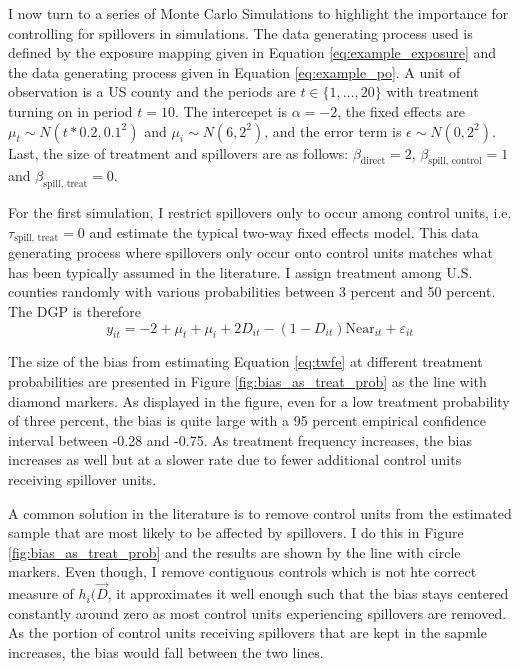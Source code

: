 \documentclass[11pt]{article}
\begin{document}
I now turn to a series of Monte Carlo Simulations to highlight the importance for controlling for spillovers in simulations. The data generating process used is defined by the exposure mapping given in Equation \ref{eq:example_exposure} and the data generating process given in Equation \ref{eq:example_po}. A unit of observation is a US county and the periods are $t \in \{1, \dots, 20\}$ with treatment turning on in period $t = 10$. The intercepet is $\alpha = -2$, the fixed effects are $\mu_t \sim N(t * 0.2, 0.1^2)$ and $\mu_i \sim N(6, 2^2)$, and the error term is $\epsilon \sim N(0, 2^2)$. Last, the size of treatment and spillovers are as follows: $\beta_{\text{direct}} = 2$, $\beta_{\text{spill, control}} = 1$ and $\beta_{\text{spill, treat}} = 0$.

For the first simulation, I restrict spillovers only to occur among control units, i.e. $\tau_{\text{spill, treat}} = 0$ and estimate the typical two-way fixed effects model. This data generating process where spillovers only occur onto control units matches what has been typically assumed in the literature. I assign treatment among U.S. counties randomly with various probabilities between 3 percent and 50 percent. The DGP is therefore 
\begin{equation}
    \label{dgp1} 
    y_{it} = -2 + \mu_t + \mu_i + 2 D_{it} - (1-D_{it}) \text{Near}_{it} + \varepsilon_{it}   
\end{equation}

The size of the bias from estimating Equation \ref{eq:twfe} at different treatment probabilities are presented in Figure \ref{fig:bias_as_treat_prob} as the line with diamond markers. As displayed in the figure, even for a low treatment probability of three percent, the bias is quite large with a 95 percent empirical confidence interval between -0.28 and -0.75. As treatment frequency increases, the bias increases as well but at a slower rate due to fewer additional control units receiving spillover units. 

A common solution in the literature is to remove control units from the estimated sample that are most likely to be affected by spillovers. I do this in Figure \ref{fig:bias_as_treat_prob} and the results are shown by the line with circle markers. Even though, I remove contiguous controls which is not hte correct measure of $h_i(\vec{D}$, it approximates it well enough such that the bias stays centered constantly around zero as most control units experiencing spillovers are removed. As the portion of control units receiving spillovers that are kept in the sapmle increases, the bias would fall between the two lines.
\end{document}
